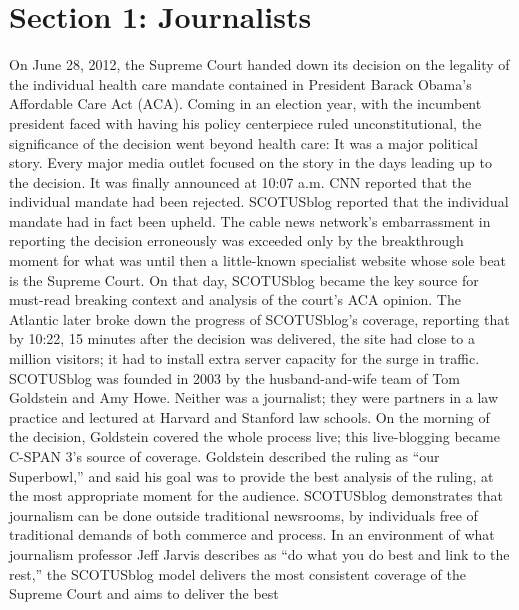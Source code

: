 \chapter{Section 1: Journalists}
On June 28, 2012, the Supreme Court handed down its decision on the legality of
the individual health care mandate contained in President Barack Obama’s Affordable
Care Act (ACA). Coming in an election year, with the incumbent president
faced with having his policy centerpiece ruled unconstitutional, the significance of
the decision went beyond health care: It was a major political story.
Every major media outlet focused on the story in the days leading up to the decision.
It was finally announced at 10:07 a.m. CNN reported that the individual
mandate had been rejected. SCOTUSblog reported that the individual mandate
had in fact been upheld.
The cable news network’s embarrassment in reporting the decision erroneously
was exceeded only by the breakthrough moment for what was until then a
little-known specialist website whose sole beat is the Supreme Court. On that
day, SCOTUSblog became the key source for must-read breaking context and
analysis of the court’s ACA opinion. The Atlantic later broke down the progress
of SCOTUSblog’s coverage, reporting that by 10:22, 15 minutes after the decision
was delivered, the site had close to a million visitors; it had to install extra
server capacity for the surge in traffic.
SCOTUSblog was founded in 2003 by the husband-and-wife team of Tom
Goldstein and Amy Howe. Neither was a journalist; they were partners in a law
practice and lectured at Harvard and Stanford law schools. On the morning of
the decision, Goldstein covered the whole process live; this live-blogging became
C-SPAN 3’s source of coverage. Goldstein described the ruling as ``our Superbowl,''
and said his goal was to provide the best analysis of the ruling, at the most
appropriate moment for the audience.
SCOTUSblog demonstrates that journalism can be done outside traditional
newsrooms, by individuals free of traditional demands of both commerce and
process. In an environment of what journalism professor Jeff Jarvis describes as
``do what you do best and link to the rest,'' the SCOTUSblog model delivers
the most consistent coverage of the Supreme Court and aims to deliver the best

